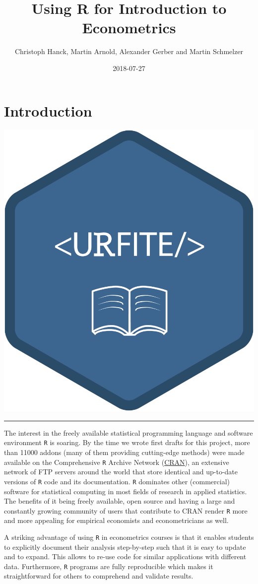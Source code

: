 \documentclass[]{book}
\title{Using R for Introduction to Econometrics}
\author{Christoph Hanck, Martin Arnold, Alexander Gerber and Martin Schmelzer}
\date{2018-07-27}
\theoremstyle{definition}
\theoremstyle{definition}
\theoremstyle{definition}
\theoremstyle{remark}
\begin{document}
\maketitle

{
\setcounter{tocdepth}{1}
\tableofcontents
}
\chapter{Introduction}\label{introduction}

\begin{center}\includegraphics[width=0.45\linewidth]{images/URFITE_logo} \end{center}

\noindent\rule{\textwidth}{1pt}

The interest in the freely available statistical programming language
and software environment \texttt{R} \citep{R-base} is soaring. By the
time we wrote first drafts for this project, more than 11000 addons
(many of them providing cutting-edge methods) were made available on the
Comprehensive \texttt{R} Archive Network
(\href{https://cran.r-project.org/}{CRAN}), an extensive network of FTP
servers around the world that store identical and up-to-date versions of
\texttt{R} code and its documentation. \texttt{R} dominates other
(commercial) software for statistical computing in most fields of
research in applied statistics. The benefits of it being freely
available, open source and having a large and constantly growing
community of users that contribute to CRAN render \texttt{R} more and
more appealing for empirical economists and econometricians as well.

A striking advantage of using \texttt{R} in econometrics courses is that
it enables students to explicitly document their analysis step-by-step
such that it is easy to update and to expand. This allows to re-use code
for similar applications with different data. Furthermore, \texttt{R}
programs are fully reproducible which makes it straightforward for
others to comprehend and validate results.
\end{document}
